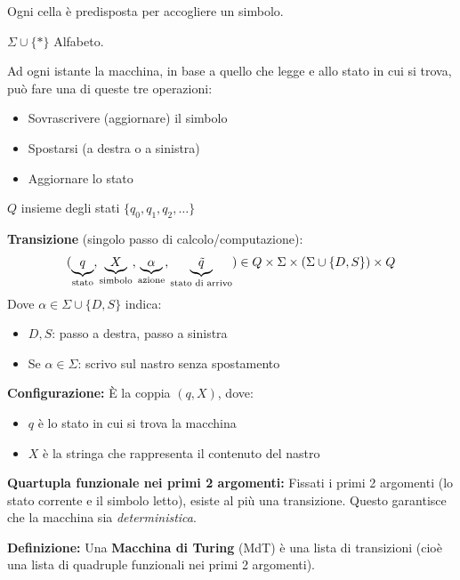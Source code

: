 Ogni cella è predisposta per accogliere un simbolo.

\vspace{0.4cm}
$\Sigma \cup \{*\}$ Alfabeto.

Ad ogni istante la macchina, in base a quello che legge e allo stato in cui si trova, può fare una di queste tre operazioni:
\begin{itemize}
    \item Sovrascrivere (aggiornare) il simbolo
    \item Spostarsi (a destra o a sinistra)
    \item Aggiornare lo stato
\end{itemize}

$Q$ insieme degli stati $\{q_0, q_1, q_2, \dots\}$

\vspace{0.4cm}
\textbf{Transizione} (singolo passo di calcolo/computazione):
$$ ( \underbrace{q}_{\text{\scriptsize stato}}, \underbrace{X}_{\text{\scriptsize simbolo}}, \underbrace{\alpha}_{\text{\scriptsize azione}}, \underbrace{\tilde{q}}_{\text{\scriptsize stato di arrivo}} ) \in Q \times \Sigma \times (\Sigma \cup \{D, S\}) \times Q $$
Dove $\alpha \in \Sigma \cup \{D, S\}$ indica:
\begin{itemize}
    \item $D, S$: passo a destra, passo a sinistra
    \item Se $\alpha \in \Sigma$: scrivo sul nastro senza spostamento
\end{itemize}

\vspace{0.4cm}
\textbf{Configurazione:} È la coppia $(q, X)$, dove:
\begin{itemize}
    \item $q$ è lo stato in cui si trova la macchina
    \item $X$ è la stringa che rappresenta il contenuto del nastro 
\end{itemize}    

\vspace{0.5cm}
\textbf{Quartupla funzionale nei primi 2 argomenti:} Fissati i primi 2 argomenti (lo stato corrente e il simbolo letto), esiste al più una transizione. Questo garantisce che la macchina sia \textit{deterministica}.

\vspace{0.4cm}
\textbf{Definizione:} Una \textbf{Macchina di Turing} (MdT) è una lista di transizioni (cioè una lista di quadruple funzionali nei primi 2 argomenti).

